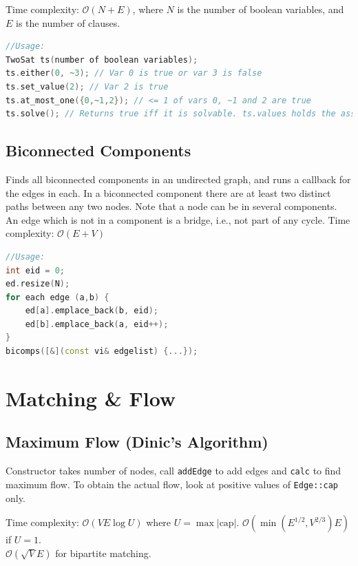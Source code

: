 \documentclass{article}
\begin{document}
Time complexity: $\mathcal{O}(N+E)$, where $N$ is the number of boolean variables, and $E$ is the number of clauses.


\begin{lstlisting}[language=C++, aboveskip=0pt]
//Usage:
TwoSat ts(number of boolean variables);
ts.either(0, ~3); // Var 0 is true or var 3 is false
ts.set_value(2); // Var 2 is true
ts.at_most_one({0,~1,2}); // <= 1 of vars 0, ~1 and 2 are true
ts.solve(); // Returns true iff it is solvable. ts.values holds the assigned values to the variables
\end{lstlisting}


\subsection*{Biconnected Components}

Finds all biconnected components in an undirected graph, and
runs a callback for the edges in each. In a biconnected component there
are at least two distinct paths between any two nodes. Note that a node can
be in several components. An edge which is not in a component is a bridge,
i.e., not part of any cycle. Time complexity: $\mathcal{O}(E + V)$



\begin{lstlisting}[language=C++]
//Usage:
int eid = 0;
ed.resize(N);
for each edge (a,b) {
    ed[a].emplace_back(b, eid);
    ed[b].emplace_back(a, eid++);
}
bicomps([&](const vi& edgelist) {...});
\end{lstlisting}

\pagebreak

\section*{Matching \& Flow}


\subsection*{Maximum Flow (Dinic's Algorithm)}

Constructor takes number of nodes, call \lstinline{addEdge} to add edges and \lstinline{calc} to find maximum flow.
To obtain the actual flow, look at positive values of \lstinline{Edge::cap} only.

Time complexity: $\mathcal{O}(VE\log U)$ where $U = \max |\text{cap}|$.
$\mathcal{O}(\min(E^{1/2}, V^{2/3})E)$ if $U = 1$.\\
$\mathcal{O}(\sqrt{V}E)$ for bipartite matching.

\end{document}
